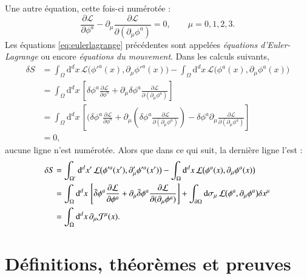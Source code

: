 \documentclass[12pt,maitrise,frenchb,natbib,twoside,initial]{dms}
\numberwithin{equation}{section}
\numberwithin{table}{chapter}
\numberwithin{figure}{chapter}
\begin{document}
Une autre équation, cette fois-ci numérotée :
\begin{equation}
	\label{eq:eulerlagrange}
	\frac{\partial\mathcal{L}}{\partial\phi^a}-\partial_\mu\frac{\partial\mathcal{L}}{\partial(\partial_\mu\phi^a)}=0,\qquad\mu=0,1,2,3.
\end{equation}
Les équations \eqref{eq:eulerlagrange} précédentes sont appelées \emph{équations d'Euler-Lagrange} ou encore \emph{équations du mouvement}. Dans les calculs suivants,
\begin{align*}
	\delta S	& = \int_\Omega\mathrm{d}^dx\,\mathcal{L}\bigl(\phi'^a(x),\partial_\mu\phi'^a(x)\bigr)-\int_\Omega\mathrm{d}^dx\,\mathcal{L}\bigl(\phi^a(x),\partial_\mu\phi^a(x)\bigr)																												\\
				& = \int_\Omega\mathrm{d}^dx\,\left[\delta\phi^a\frac{\partial\mathcal{L}}{\partial\phi^a}+\partial_\mu\delta\phi^a\frac{\partial\mathcal{L}}{\partial(\partial_\mu\phi^a)}\right]																									\\
				& = \int_\Omega\mathrm{d}^dx\,\left[(\delta\phi^a\frac{\partial\mathcal{L}}{\partial\phi^a}+\partial_\mu\left(\delta\phi^a\frac{\partial\mathcal{L}}{\partial(\partial_\mu\phi^a)}\right)-\delta\phi^a\partial_\mu\frac{\partial\mathcal{L}}{\partial(\partial_\mu\phi^a)}\right]	\\
				& = 0,
\end{align*}
aucune ligne n'est numérotée. Alors que dans ce qui suit, la derni\`ere ligne l'est :
\begin{align}
	\delta S	& = \int_{\Omega'}\mathrm{d}^dx'\,\mathcal{L}\bigl(\phi'^a(x'),\partial'_\mu\phi'^a(x')\bigr)-\int_\Omega\mathrm{d}^dx\,\mathcal{L}\bigl(\phi^a(x),\partial_\mu\phi^a(x)\bigr)																															\notag\\
				& = \int_\Omega\mathrm{d}^dx\,\left[\bar{\delta}\phi^a\frac{\partial\mathcal{L}}{\partial\phi^a}+\partial_\mu\bar{\delta}\phi^a\frac{\partial\mathcal{L}}{\partial(\partial_\mu\phi^a)}\right]+\int_{\partial\Omega}\mathrm{d}\sigma_\mu\,\mathcal{L}\bigl(\phi^a,\partial_\mu\phi^a\bigr)\delta x^\mu	\notag\\
				& = \int_\Omega\mathrm{d}^dx\,\partial_\mu\mathcal{J}^\mu(x).	\label{eq:variationaction}
\end{align}


\section{Définitions, théor\`emes et preuves}
\end{document}
